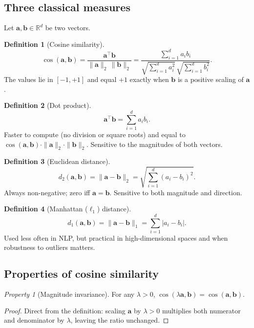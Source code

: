 \documentclass[12pt,a4paper]{report}
\theoremstyle{definition}
\newtheorem{definition}{Definition}[section]
\theoremstyle{remark}
\newtheorem{property}{Property}[section]
\begin{document}
\subsection{Three classical measures}

Let $\mathbf{a}, \mathbf{b} \in \mathbb{R}^d$ be two vectors.

\begin{definition}[Cosine similarity]
\[ \cos(\mathbf{a}, \mathbf{b}) = \frac{\mathbf{a}^\top \mathbf{b}}{\|\mathbf{a}\|_2\, \|\mathbf{b}\|_2} = \frac{\sum_{i=1}^{d} a_i b_i}{\sqrt{\sum_{i=1}^{d} a_i^2}\, \sqrt{\sum_{i=1}^{d} b_i^2}}. \]
The values lie in $[-1, +1]$ and equal $+1$ exactly when $\mathbf{b}$ is a positive scaling of $\mathbf{a}$.
\end{definition}

\begin{definition}[Dot product]
\[ \mathbf{a}^\top \mathbf{b} = \sum_{i=1}^{d} a_i b_i. \]
Faster to compute (no division or square roots) and equal to $\cos(\mathbf{a}, \mathbf{b}) \cdot \|\mathbf{a}\|_2 \cdot \|\mathbf{b}\|_2$. Sensitive to the magnitudes of both vectors.
\end{definition}

\begin{definition}[Euclidean distance]
\[ d_2(\mathbf{a}, \mathbf{b}) = \|\mathbf{a} - \mathbf{b}\|_2 = \sqrt{\sum_{i=1}^{d} (a_i - b_i)^2}. \]
Always non-negative; zero iff $\mathbf{a} = \mathbf{b}$. Sensitive to both magnitude and direction.
\end{definition}

\begin{definition}[Manhattan ($\ell_1$) distance]
\[ d_1(\mathbf{a}, \mathbf{b}) = \|\mathbf{a} - \mathbf{b}\|_1 = \sum_{i=1}^{d} |a_i - b_i|. \]
Used less often in NLP, but practical in high-dimensional spaces and when robustness to outliers matters.
\end{definition}

\subsection{Properties of cosine similarity}

\begin{property}[Magnitude invariance]
For any $\lambda > 0$, $\cos(\lambda \mathbf{a}, \mathbf{b}) = \cos(\mathbf{a}, \mathbf{b})$.
\end{property}

\begin{proof}
Direct from the definition: scaling $\mathbf{a}$ by $\lambda > 0$ multiplies both numerator and denominator by $\lambda$, leaving the ratio unchanged.
\end{proof}
\end{document}
